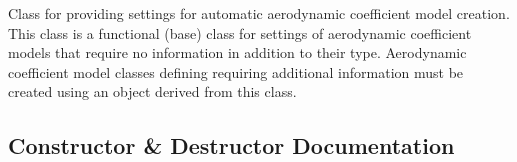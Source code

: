 Class for providing settings for automatic aerodynamic coefficient model creation. This class is a functional (base) class for settings of aerodynamic coefficient models that require no information in addition to their type. Aerodynamic coefficient model classes defining requiring additional information must be created using an object derived from this class. 

\subsection{Constructor \& Destructor Documentation}
